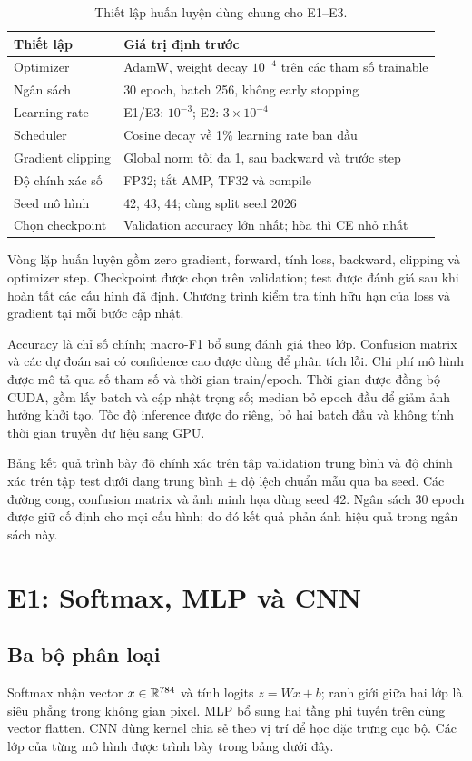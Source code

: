 \documentclass[12pt,a4paper]{report}
\begin{document}
\begin{table}[htbp]\centering
\begin{tabularx}{\textwidth}{@{}lX@{}}\toprule
Thiết lập & Giá trị định trước\\\midrule
Optimizer & AdamW, weight decay $10^{-4}$ trên các tham số trainable\\
Ngân sách & 30 epoch, batch 256, không early stopping\\
Learning rate & E1/E3: $10^{-3}$; E2: $3\times10^{-4}$\\
Scheduler & Cosine decay về 1\% learning rate ban đầu\\
Gradient clipping & Global norm tối đa 1, sau backward và trước step\\
Độ chính xác số & FP32; tắt AMP, TF32 và compile\\
Seed mô hình & 42, 43, 44; cùng split seed 2026\\
Chọn checkpoint & Validation accuracy lớn nhất; hòa thì CE nhỏ nhất\\\bottomrule
\end{tabularx}
\caption{Thiết lập huấn luyện dùng chung cho E1–E3.}
\end{table}

Vòng lặp huấn luyện gồm zero gradient, forward, tính loss, backward, clipping và optimizer step. Checkpoint được chọn trên validation; test được đánh giá sau khi hoàn tất các cấu hình đã định. Chương trình kiểm tra tính hữu hạn của loss và gradient tại mỗi bước cập nhật.

Accuracy là chỉ số chính; macro-F1 bổ sung đánh giá theo lớp. Confusion matrix và các dự đoán sai có confidence cao được dùng để phân tích lỗi. Chi phí mô hình được mô tả qua số tham số và thời gian train/epoch. Thời gian được đồng bộ CUDA, gồm lấy batch và cập nhật trọng số; median bỏ epoch đầu để giảm ảnh hưởng khởi tạo. Tốc độ inference được đo riêng, bỏ hai batch đầu và không tính thời gian truyền dữ liệu sang GPU.

Bảng kết quả trình bày độ chính xác trên tập validation trung bình và độ chính xác trên tập test dưới dạng trung bình $\pm$ độ lệch chuẩn mẫu qua ba seed. Các đường cong, confusion matrix và ảnh minh họa dùng seed 42. Ngân sách 30 epoch được giữ cố định cho mọi cấu hình; do đó kết quả phản ánh hiệu quả trong ngân sách này.

\chapter{E1: Softmax, MLP và CNN}
\section{Ba bộ phân loại}
Softmax nhận vector $x\in\mathbb{R}^{784}$ và tính logits $z=Wx+b$; ranh giới giữa hai lớp là siêu phẳng trong không gian pixel. MLP bổ sung hai tầng phi tuyến trên cùng vector flatten. CNN dùng kernel chia sẻ theo vị trí để học đặc trưng cục bộ. Các lớp của từng mô hình được trình bày trong bảng dưới đây.
\end{document}
